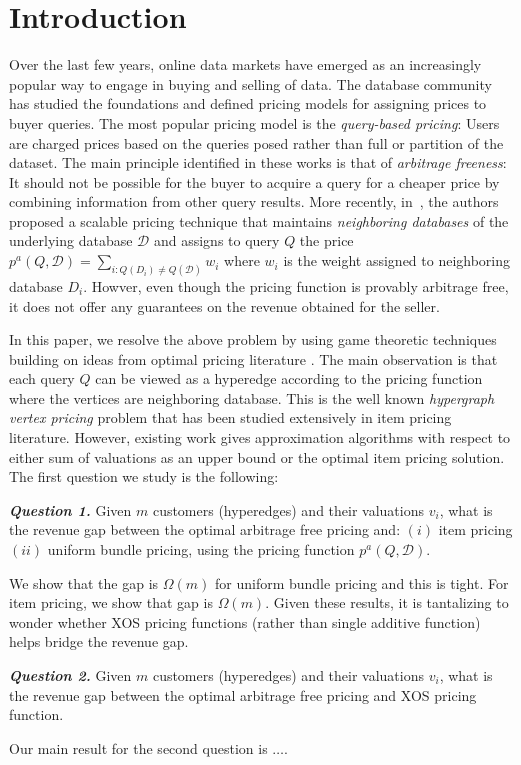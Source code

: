\section{Introduction}

Over the last few years, online data markets have emerged as an increasingly popular way to engage in buying and selling of data. The database community has studied the foundations and defined  pricing models for assigning prices to buyer queries. The most popular pricing model is the {\em query-based pricing}: Users are charged prices based on the queries posed rather than full or partition of the dataset. The main principle identified in these works is that of {\em arbitrage freeness}: It should not be possible for the buyer to acquire a query for a cheaper price by combining information from other query results. More recently, in~\cite{deep2017qirana}, the authors proposed a scalable pricing technique that maintains {\em neighboring databases} of the underlying database $\mathcal{D}$ and assigns to query $Q$ the price $p^{a}(Q,\mathcal{D}) = \sum \limits_{i:Q(D_i) \neq Q(\mathcal{D})} w_i$ where $w_i$ is the weight assigned to neighboring database $D_i$. Howver, even though the pricing function is provably arbitrage free, it does not offer any guarantees on the revenue obtained for the seller. 

In this paper, we resolve the above problem by using game theoretic techniques building on ideas from optimal pricing literature \cite{guruswami2005profit}. The main observation is that each query $Q$ can be viewed as a hyperedge according to the pricing function where the vertices are neighboring database. This is the well known {\em hypergraph vertex pricing} problem that has been studied extensively in item pricing literature. However, existing work gives  approximation algorithms with respect to either sum of valuations as an upper bound or the optimal item pricing solution. The first question we study is the following:

\vspace{1em}
\textbf{\textit{Question 1.}} Given $m$ customers (hyperedges) and their valuations $v_i$, what is the revenue gap between the optimal arbitrage free pricing and: $(i)$ item pricing $(ii)$ uniform bundle pricing, using the pricing function $p^{a}(Q,\mathcal{D})$.

\vspace{1em}
We show that the gap is $\Omega(m)$ for uniform bundle pricing and this is tight. For item pricing, we show that gap is $\Omega(m)$. Given these results, it is tantalizing to wonder whether XOS pricing functions (rather than single additive function) helps bridge the revenue gap. 

\vspace{1em}
\textbf{\textit{Question 2.}} Given $m$ customers (hyperedges) and their valuations $v_i$, what is the revenue gap between the optimal arbitrage free pricing and XOS pricing function.

\vspace{1em}
Our main result for the second question is $\dots$.



